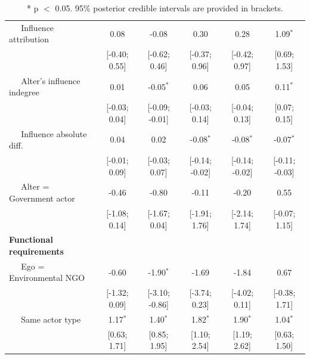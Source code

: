 \documentclass[12pt,pdflatex]{elsarticle}
\begin{document}
\begin{table}[ht]
\begin{tabular}{lccccc}
  $\;\;\;\;$ Influence attribution & 0.08 & -0.08 & 0.30 & 0.28 & 1.09$^{\ast}$ \\ 
   & [-0.40; 0.55] & [-0.62; 0.46] & [-0.37; 0.96] & [-0.42; 0.97] & [0.69; 1.53] \\ 
  $\;\;\;\;$ Alter's influence indegree & 0.01 & -0.05$^{\ast}$ & 0.06 & 0.05 & 0.11$^{\ast}$ \\ 
   & [-0.03; 0.04] & [-0.09; -0.01] & [-0.03; 0.14] & [-0.04; 0.13] & [0.07; 0.15] \\ 
  $\;\;\;\;$ Influence absolute diff. & 0.04 & 0.02 & -0.08$^{\ast}$ & -0.08$^{\ast}$ & -0.07$^{\ast}$ \\ 
   & [-0.01; 0.09] & [-0.03; 0.07] & [-0.14; -0.02] & [-0.14; -0.02] & [-0.11; -0.03] \\ 
  $\;\;\;\;$ Alter = Government actor & -0.46 & -0.80 & -0.11 & -0.20 & 0.55 \\ 
   & [-1.08; 0.14] & [-1.67; 0.04] & [-1.91; 1.76] & [-2.14; 1.74] & [-0.07; 1.15] \\ 
  \textbf{Functional requirements} &  &  &  &  &  \\ 
  $\;\;\;\;$ Ego = Environmental NGO & -0.60 & -1.90$^{\ast}$ & -1.69 & -1.84 & 0.67 \\ 
   & [-1.32; 0.09] & [-3.10; -0.86] & [-3.74; 0.23] & [-4.02; 0.11] & [-0.38; 1.71] \\ 
  $\;\;\;\;$ Same actor type & 1.17$^{\ast}$ & 1.40$^{\ast}$ & 1.82$^{\ast}$ & 1.90$^{\ast}$ & 1.04$^{\ast}$ \\ 
   & [0.63; 1.71] & [0.85; 1.95] & [1.10; 2.54] & [1.19; 2.62] & [0.63; 1.50] \\ 
   \hline
\hline
\end{tabular}
\endgroup
\caption{* p $<$ 0.05. 95\% posterior credible intervals are provided in brackets.} 
\label{tab:regTable_latSpace}
\end{table}
\end{document}
